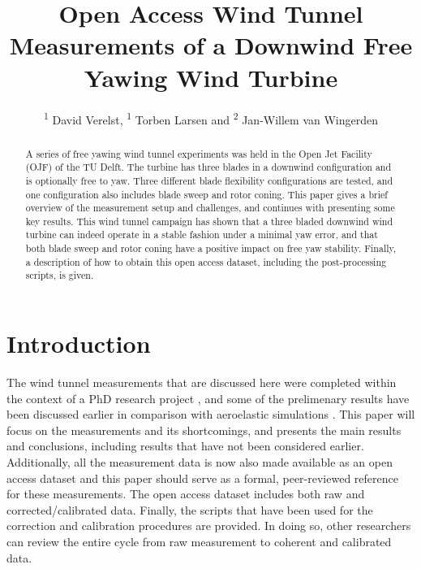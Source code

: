 \documentclass[a4paper]{jpconf}
\begin{document}
\title{Open Access Wind Tunnel Measurements of a Downwind Free Yawing Wind Turbine}

\author{\textsuperscript{1} David Verelst, \textsuperscript{1} Torben Larsen and \textsuperscript{2} Jan-Willem van Wingerden}

\address{\textsuperscript{1} DTU Wind Energy - Loads and Control, \textsuperscript{2} TU Delft - Delft Center for Systems and Control}


\begin{abstract}
A series of free yawing wind tunnel experiments was held in the Open Jet Facility (OJF) of the TU Delft. The turbine has three blades in a downwind configuration and is optionally free to yaw. Three different blade flexibility configurations are tested, and one configuration also includes blade sweep and rotor coning. This paper gives a brief overview of the measurement setup and challenges, and continues with presenting some key results. This wind tunnel campaign has shown that a three bladed downwind wind turbine can indeed operate in a stable fashion under a minimal yaw error, and that both blade sweep and rotor coning have a positive impact on free yaw stability. Finally, a description of how to obtain this open access dataset, including the post-processing scripts, is given.
\end{abstract}


\section{Introduction}

The wind tunnel measurements that are discussed here were completed within the context of a PhD research project \cite{verelst_numerical_2013:diss}, and some of the prelimenary results have been discussed earlier in comparison with aeroelastic simulations \cite{verelst_wind_2014}. This paper will focus on the measurements and its shortcomings, and presents the main results and conclusions, including results that have not been considered earlier. Additionally, all the measurement data is now also made available as an open access dataset and this paper should serve as a formal, peer-reviewed reference for these measurements. The open access dataset includes both raw and corrected/calibrated data. Finally, the scripts that have been used for the correction and calibration procedures are provided. In doing so, other researchers can review the entire cycle from raw measurement to coherent and calibrated data.
\end{document}
